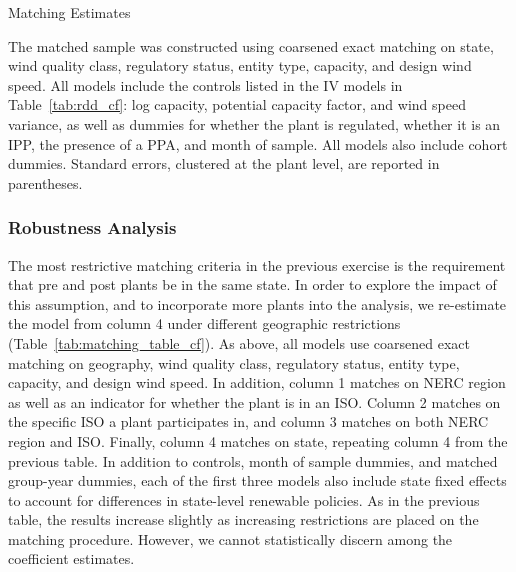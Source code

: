 \documentclass[12pt]{article}
\begin{document}
\begin{table}[h]
\begin{centering}
\caption{Matching Estimates \label{tab:matching_group}}

\par\end{centering}
\footnotesize

The matched sample was constructed using coarsened exact matching on state, wind quality class, regulatory status, entity type, capacity, and design wind speed. All models include the controls listed in the IV models in Table~\ref{tab:rdd_cf}: log capacity, potential capacity factor, and wind speed variance, as well as dummies for whether the plant is regulated, whether it is an IPP, the presence of a PPA, and month of sample. All models also include cohort dummies. Standard errors, clustered at the plant level, are reported in parentheses.
\end{table}

\subsubsection*{Robustness Analysis}

The most restrictive matching criteria in the previous exercise is the requirement that pre and post plants be in the same state. In order to explore the impact of this assumption, and to incorporate more plants into the analysis, we re-estimate the model from column 4 under different geographic restrictions (Table~\ref{tab:matching_table_cf}). As above, all models use coarsened exact matching on geography, wind quality class, regulatory status, entity type, capacity, and design wind speed. In addition, column 1 matches on NERC region as well as an indicator for whether the plant is in an ISO. Column 2 matches on the specific ISO a plant participates in, and column 3 matches on both NERC region and ISO. Finally, column 4 matches on state, repeating column 4 from the previous table. In addition to controls, month of sample dummies, and matched group-year dummies, each of the first three models also include state fixed effects to account for differences in state-level renewable policies. As in the previous table, the results increase slightly as increasing restrictions are placed on the matching procedure. However, we cannot statistically discern among the coefficient estimates.
\end{document}
